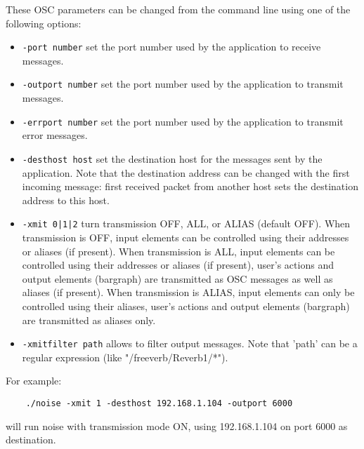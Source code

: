 These OSC parameters can be changed from the command line using one of the following options:
\begin{itemize}
\item \lstinline'-port number' set the port number used by the application to receive messages.
\item \lstinline'-outport number' set the port number used by the application to transmit messages.
\item \lstinline'-errport number' set the port number used by the application to transmit error messages.
\item \lstinline'-desthost host' set the destination host for the messages sent by the application. Note that the destination address can be changed with the first incoming message: first received packet from another host sets the destination address to this host.
\item \lstinline'-xmit 0|1|2' turn transmission OFF, ALL, or ALIAS (default OFF). When transmission is OFF, input elements can be controlled using their addresses or aliases (if present). When transmission is ALL, input elements can be controlled using their addresses or aliases (if present), user's actions and output elements (bargraph) are transmitted as OSC messages as well as aliases (if present). When transmission is ALIAS,  input elements can only be controlled using their aliases, user's actions and output elements (bargraph) are transmitted as aliases only.
\item \lstinline'-xmitfilter path' allows to filter output messages. Note that 'path' can be a regular expression (like "/freeverb/Reverb1/*").
\end{itemize}

For example:
\begin{lstlisting}
	./noise -xmit 1 -desthost 192.168.1.104 -outport 6000
\end{lstlisting}
will run noise with transmission mode ON, using 192.168.1.104 on port 6000 as destination.


